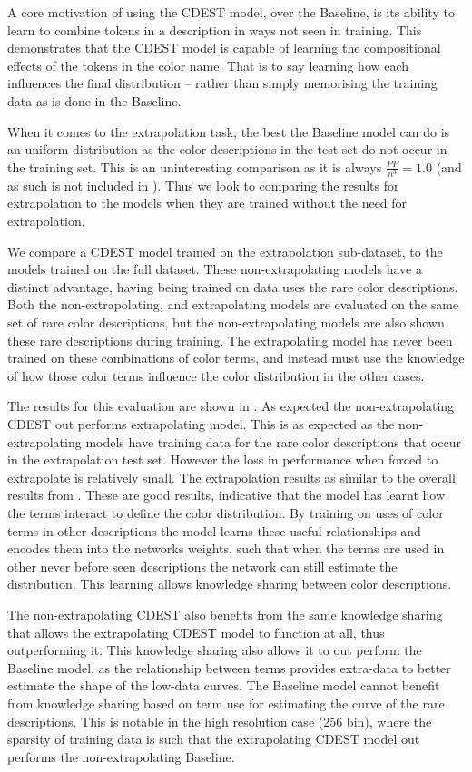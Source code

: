 \documentclass[11pt,a4paper]{article}
\begin{document}
A core motivation of using the CDEST model, over the Baseline, is its ability to learn to combine tokens in a description in ways not seen in training.
This demonstrates that the CDEST model is capable of learning the compositional effects of the tokens in the color name.
That is to say learning how each influences the final distribution -- rather than simply memorising the training data as is done in the Baseline.

When it comes to the extrapolation task, the best the Baseline model can do is an uniform distribution as the color descriptions in the test set do not occur in the training set.
This is an uninteresting comparison as it is always $\frac{PP}{n^3}=1.0$ (and as such is not included in ).
Thus we look to comparing the results for extrapolation to the models when they are trained without the need for extrapolation.

We compare a CDEST model trained on the extrapolation sub-dataset, to the models trained on the full dataset.
These non-extrapolating models have a distinct advantage, having being trained on data uses the rare color descriptions.
Both the non-extrapolating, and extrapolating models are evaluated on the same set of rare color descriptions,
but the non-extrapolating models are also shown these rare descriptions during training.
The extrapolating model has never been trained on these combinations of color terms,
and instead must use the knowledge of how those color terms influence the color distribution in the other cases.

The results for this evaluation are shown in .
As expected the non-extrapolating CDEST out performs extrapolating model.
This is as expected as the non-extrapolating models have training data for the rare color descriptions that occur in the extrapolation test set.
However the loss in performance when forced to extrapolate is relatively small. The extrapolation results as similar to the overall results from .
These are good results, indicative that the model has learnt how the terms interact to define the color distribution.
By training on uses of color terms in other descriptions the model learns these useful relationships and encodes them into the networks weights, such that when the terms are used in other never before seen descriptions the network can still estimate the distribution.
This learning allows knowledge sharing between color descriptions.


The non-extrapolating CDEST also benefits from the same knowledge sharing that allows the extrapolating CDEST model to function at all, thus outperforming it.
This knowledge sharing also allows it to out perform the Baseline model, as the relationship between terms provides extra-data to better estimate the shape of the low-data curves.
The Baseline model cannot benefit from knowledge sharing based on term use for estimating the curve of the rare descriptions.
This is notable in the high resolution case (256 bin),
where the sparsity of training data is such that the extrapolating CDEST model out performs the non-extrapolating Baseline.
\end{document}
